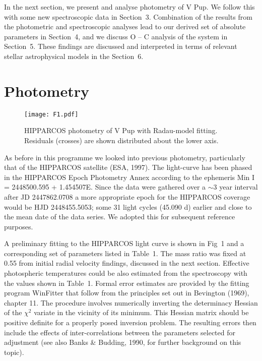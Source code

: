 \documentclass[useAMS,usenatbib]{mnras}                                                                           \usepackage[pdftex]{graphicx}
\begin{document}
 
 In the next section, we present and analyse photometry of V Pup. We follow this 
with some new spectroscopic data in Section~3. Combination of the
results from the photometric and spectroscopic analyses lead to
 our derived set of absolute parameters in Section~4, and we discuss O -- C analysis of the system in Section~5. 
 These findings are discussed and interpreted in terms of 
 relevant stellar astrophysical models in the Section~6.
 

\section{Photometry}
 
\begin{figure}
\label{fig-1}
\centering
\texttt{[image: F1.pdf]}
\caption{HIPPARCOS photometry of V Pup with Radau-model fitting.
Residuals (crosses) are shown distributed about the lower axis.}
\end{figure}


 As before in this programme we 
 looked into previous photometry, particularly that of the 
 HIPPARCOS satellite (ESA, 1997).
The light-curve has been phased in the HIPPARCOS Epoch Photometry Annex according to the
ephemeris Min I = 2448500.595 + 1.454507E. 
Since the data were gathered over a $\sim$3 year interval after JD 2447862.0708 
 a more appropriate epoch for the HIPPARCOS coverage would be 
 HJD 2448455.5053; some 31 light cycles (45.090 d) earlier
 and close to the mean date of the data series.
We adopted this for subsequent reference purposes.

A preliminary fitting to the HIPPARCOS light curve is shown in Fig~1
and a corresponding set of parameters listed in Table~1.
The mass ratio was fixed at 0.55 from initial radial velocity findings, 
discussed in the next section.
Effective photospheric temperatures could be also 
estimated from the spectroscopy with the values shown
in Table~1.  Formal error estimates are provided by the fitting program
{\sc WinFitter} that follow from the principles set out in 
 Bevington (1969), chapter 11.  The procedure involves numerically 
inverting the determinacy Hessian of the $\chi^2$ variate in the vicinity of
its minimum.  This Hessian matrix should be positive definite for a properly posed
inversion problem.  The resulting errors then include the effects of inter-correlations
between the parameters selected for adjustment (see also Banks \& Budding, 1990,
for further background on this topic). 
\end{document}
